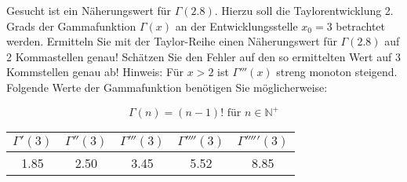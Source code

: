 \item Gesucht ist ein Näherungswert für $\Gamma(2.8)$. Hierzu soll die Taylorentwicklung 2. Grads der Gammafunktion $\Gamma(x)$ an der Entwicklungsstelle $x_0=3$ betrachtet werden. Ermitteln Sie mit der Taylor-Reihe einen Näherungswert für $\Gamma(2.8)$ auf 2 Kommastellen genau! Schätzen Sie den Fehler auf den so ermittelten Wert auf 3 Kommstellen genau ab! Hinweis: Für $x>2$ ist $\Gamma'''(x)$ streng monoton steigend. Folgende Werte der Gammafunktion benötigen Sie möglicherweise:

\begin{multicols}{2}

$$\Gamma(n) = (n-1)! \text{ für } n \in \mathbb{N}^{+}$$

\begin{tabular}{ c | c | c | c | c}
	$\Gamma'(3)$ & $\Gamma''(3)$ & $\Gamma'''(3)$ & $\Gamma''''(3)$ & $\Gamma'''''(3)$ \\
	\hline
	1.85         &  2.50         & 3.45           &  5.52           & 8.85
\end{tabular}

\end{multicols}
